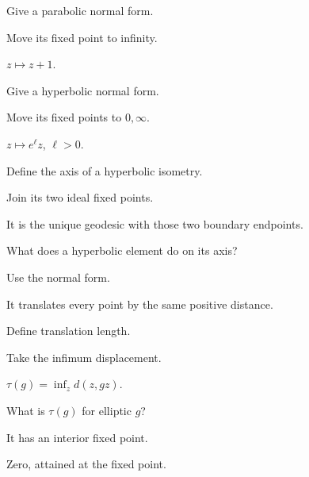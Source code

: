 \begin{exercise}\label{exr:vii34-10}
Give a parabolic normal form.
\end{exercise}
\begin{hint}
Move its fixed point to infinity.
\end{hint}
\begin{solution}
\(z\mapsto z+1\).
\end{solution}

\begin{exercise}\label{exr:vii34-11}
Give a hyperbolic normal form.
\end{exercise}
\begin{hint}
Move its fixed points to \(0,\infty\).
\end{hint}
\begin{solution}
\(z\mapsto e^\ell z\), \(\ell>0\).
\end{solution}

\begin{exercise}\label{exr:vii34-12}
Define the axis of a hyperbolic isometry.
\end{exercise}
\begin{hint}
Join its two ideal fixed points.
\end{hint}
\begin{solution}
It is the unique geodesic with those two boundary endpoints.
\end{solution}

\begin{exercise}\label{exr:vii34-13}
What does a hyperbolic element do on its axis?
\end{exercise}
\begin{hint}
Use the normal form.
\end{hint}
\begin{solution}
It translates every point by the same positive distance.
\end{solution}

\begin{exercise}\label{exr:vii34-14}
Define translation length.
\end{exercise}
\begin{hint}
Take the infimum displacement.
\end{hint}
\begin{solution}
\(\tau(g)=\inf_z d(z,gz)\).
\end{solution}

\begin{exercise}\label{exr:vii34-15}
What is \(\tau(g)\) for elliptic \(g\)?
\end{exercise}
\begin{hint}
It has an interior fixed point.
\end{hint}
\begin{solution}
Zero, attained at the fixed point.
\end{solution}

